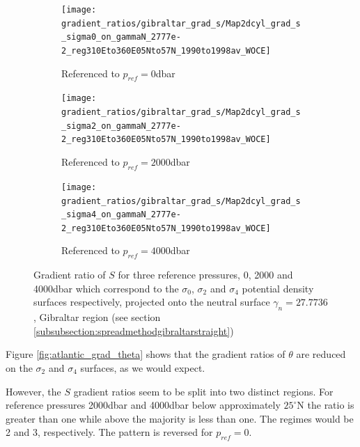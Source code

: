 \begin{figure}[htbp]
    \centering
     
     \begin{subfigure}{0.4\textwidth}
         
         \texttt{[image: gradient\_ratios/gibraltar\_grad\_s/Map2dcyl\_grad\_s\_sigma0\_on\_gammaN\_2777e-2\_reg310Eto360E05Nto57N\_1990to1998av\_WOCE]}
         \caption{Referenced to $p_{ref} = 0$dbar}
         \label{fig:subplot_gibraltar_grad_s_sig0}
     \end{subfigure}
     \begin{subfigure}{0.4\textwidth}
         
         \texttt{[image: gradient\_ratios/gibraltar\_grad\_s/Map2dcyl\_grad\_s\_sigma2\_on\_gammaN\_2777e-2\_reg310Eto360E05Nto57N\_1990to1998av\_WOCE]}
         \caption{Referenced to $p_{ref} = 2000$dbar}
         \label{fig:subplot_gibraltar_grad_s_sig2}
     \end{subfigure}
     
     \begin{subfigure}{0.4\textwidth}
         
         \texttt{[image: gradient\_ratios/gibraltar\_grad\_s/Map2dcyl\_grad\_s\_sigma4\_on\_gammaN\_2777e-2\_reg310Eto360E05Nto57N\_1990to1998av\_WOCE]}
         \caption{Referenced to $p_{ref} = 4000$dbar}
         \label{fig:subplot_gibraltar_grad_s_sig4}
     \end{subfigure}
     
    \caption{Gradient ratio of $S$ for three reference pressures, 0, 2000 and 4000dbar which correspond to the $\sigma_0$, $\sigma_2$ and $\sigma_4$ potential density surfaces respectively, projected onto the neutral surface $\gamma_n = 27.7736$, Gibraltar region (see section \ref{subsubsection:spreadmethodgibraltarstraight})}
    \label{fig:gibraltar_grad_s}
    
\end{figure}

Figure \ref{fig:atlantic_grad_theta} shows that the gradient ratios of $\theta$ are reduced on the $\sigma_2$ and $\sigma_4$ surfaces, as we would expect. 

However, the $S$ gradient ratios seem to be split into two distinct regions. For reference pressures 2000dbar and 4000dbar below approximately $25^{\circ}$N the ratio is greater than one while above the majority is less than one. The regimes would be 2 and 3, respectively. The pattern is reversed for $p_{ref}=0$. 

